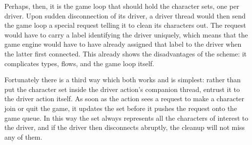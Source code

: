 Perhaps, then, it is the game loop that should hold the character sets,
one per driver.
Upon sudden disconnection of its driver, a driver thread would then send the
game loop a special request telling it to clean its characters out.
The request would have to carry a label identifying the driver uniquely,
which means that the game engine would have to have already assigned that label
to the driver when the latter first connected.
This already shows the disadvantages of the scheme: it complicates types,
flows, and the game loop itself.

Fortunately there is a third way which both works and is simplest:
rather than put the character set inside the driver action's companion
thread, entrust it to the driver action itself.  As soon as the action
sees a request to make a character join or quit the game, it updates
the set before it pushes the request onto the game queue.  In this way
the set always represents all the characters of interest to the
driver, and if the driver then disconnects abruptly, the cleanup will
not miss any of them.

